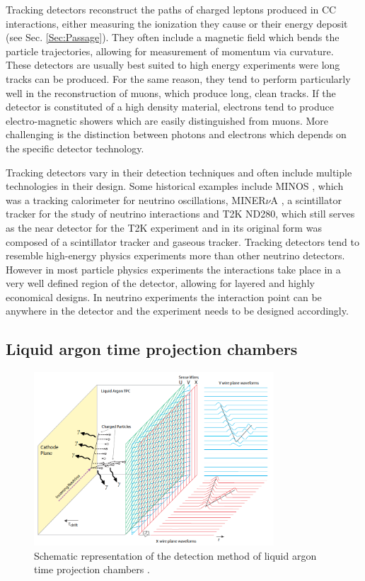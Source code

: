 Tracking detectors reconstruct the paths of charged leptons produced in CC interactions, either measuring the ionization they cause or their energy deposit (see Sec. \ref{Sec:Passage}). They often include a magnetic field which bends the particle trajectories, allowing for measurement of momentum via curvature. These detectors are usually best suited to high energy experiments were long tracks can be produced. For the same reason, they tend to perform particularly well in the reconstruction of muons, which produce long, clean tracks. If the detector is constituted of a high density material, electrons tend to produce electro-magnetic showers which are easily distinguished from muons. More challenging is the distinction between photons and electrons which depends on the specific detector technology. 

Tracking detectors vary in their detection techniques and often include multiple technologies in their design. Some historical examples include MINOS \cite{MINOS:1998kez}, which was a tracking calorimeter for neutrino oscillations, MINER$\nu$A \cite{MINERvA:2013zvz}, a scintillator tracker for the study of neutrino interactions and T2K ND280\cite{T2K:2011qtm}, which still serves as the near detector for the T2K experiment and in its original form was composed of a scintillator tracker and gaseous tracker.  Tracking detectors tend to resemble high-energy physics experiments more than other neutrino detectors. However in most particle physics experiments the interactions take place in a very well defined region of the detector, allowing for layered and highly economical designs. In neutrino experiments the interaction point can be anywhere in the detector and the experiment needs to be designed accordingly.

\subsection{Liquid argon time projection chambers}

\begin{figure}[!t]
     \centering
     \includegraphics[width=0.8\textwidth]{figures/ch3-DUNE/TheBoPicture.png}
     \caption[Schematic representation of the detection method of liquid argon time projection chambers]{Schematic representation of the detection method of liquid argon time projection chambers \cite{DUNE:2020TDR1}.}
        \label{fig:LArTPCdiagram}
\end{figure}

